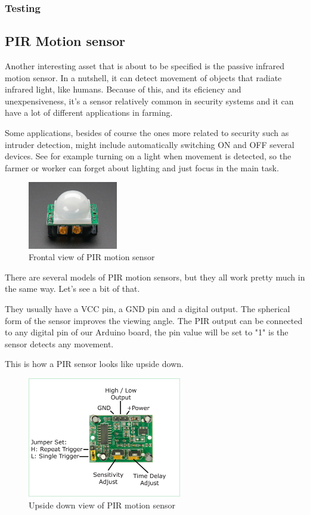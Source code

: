 \subsubsection{Testing}

\subsection{PIR Motion sensor}
Another interesting asset that is about to be specified is the passive infrared motion sensor\cite{pir-guide}. In a nutshell, it can detect movement of objects that radiate infrared light, like humans. Because of this, and its eficiency and unexpensiveness, it's a sensor relatively common in security systems and it can have a lot of different applications in farming.

Some applications, besides of course the ones more related to security such as intruder detection, might include automatically switching ON and OFF several devices. See for example turning on a light when movement is detected, so the farmer or worker can forget about lighting and just focus in the main task.

\begin{figure}[H]
    \centering
    \includegraphics[width=0.35\textwidth]{fig/pir.jpg}
    \caption{Frontal view of PIR motion sensor}
    \label{fig:pir}
\end{figure}


There are several models of PIR motion sensors, but they all work pretty much in the same way. Let's see a bit of that.

They usually have a VCC pin, a GND pin and a digital output. The spherical form of the sensor improves the viewing angle. The PIR output can be connected to any digital pin of our Arduino board, the pin value will be set to "1" is the sensor detects any movement.

This is how a PIR sensor looks like upside down.

\begin{figure}[H]
    \centering
    \includegraphics[width=0.6\textwidth]{fig/pir-upside-down.png}
    \caption{Upside down view of PIR motion sensor}
    \label{fig:pir-upsidedown}
\end{figure}

